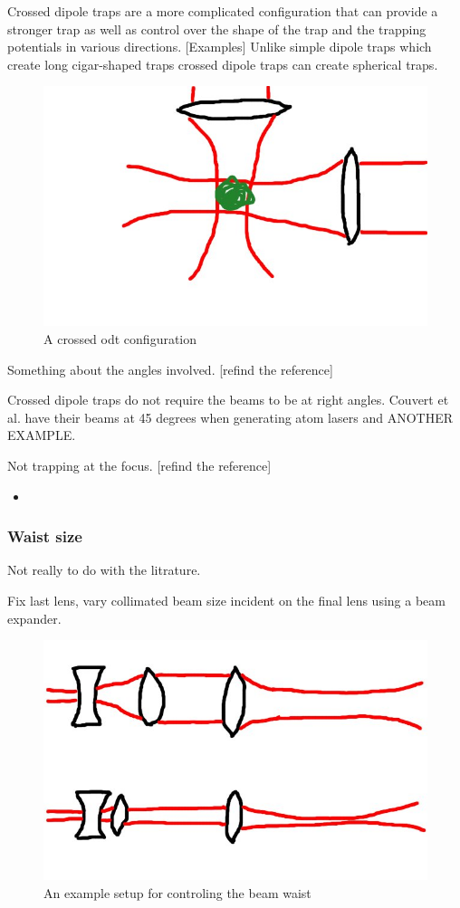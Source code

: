 Crossed dipole traps\cite{barrett_all-optical_2001, xiong_evaporative_2010, arnold_all-optical_2011, fu_bose-einstein_2011} are a more complicated configuration that can provide a stronger trap as well as control over the shape of the trap and the trapping potentials in various directions. [Examples] Unlike simple dipole traps which create long cigar-shaped traps crossed dipole traps can create spherical traps.

\begin{figure}[h]
	\centering
	\includegraphics[scale=0.32]{figs/crosseddipoletrap.jpg}
	\caption[Title]{A crossed \gls{odt} configuration}
	\label{figs/MOT.pdf}
\end{figure}

Something about the angles involved. [refind the reference]

Crossed dipole traps do not require the beams to be at right angles. Couvert et al. \cite{couvert_quasi-monomode_2008} have their beams at 45 degrees when generating atom lasers and ANOTHER EXAMPLE.

Not trapping at the focus. [refind the reference]

\begin{itemize}
    \item 
\end{itemize}
\subsubsection{Waist size}

Not really to do with the litrature.

Fix last lens, vary collimated beam size incident on the final lens using a beam expander.

\begin{figure}[h]
	\centering
	\includegraphics[scale=0.32]{figs/waistcontrol.jpg}
	\caption[Title]{An example setup for controling the beam waist}
	\label{figs/MOT.pdf}
\end{figure}

